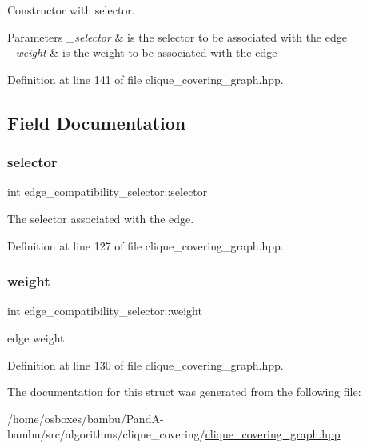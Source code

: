 Constructor with selector. 


\begin{DoxyParams}{Parameters}
{\em \+\_\+selector} & is the selector to be associated with the edge \\
\hline
{\em \+\_\+weight} & is the weight to be associated with the edge \\
\hline
\end{DoxyParams}


Definition at line 141 of file clique\+\_\+covering\+\_\+graph.\+hpp.



\subsection{Field Documentation}
\mbox{\label{structedge__compatibility__selector_aefa2ed746b66dbb338f27726b2681ec4}} 
\subsubsection{\texorpdfstring{selector}{selector}}
{\footnotesize\ttfamily int edge\+\_\+compatibility\+\_\+selector\+::selector}



The selector associated with the edge. 



Definition at line 127 of file clique\+\_\+covering\+\_\+graph.\+hpp.

\mbox{\label{structedge__compatibility__selector_a41b75fa94fa11ccdd3515e3adb138134}} 
\subsubsection{\texorpdfstring{weight}{weight}}
{\footnotesize\ttfamily int edge\+\_\+compatibility\+\_\+selector\+::weight}



edge weight 



Definition at line 130 of file clique\+\_\+covering\+\_\+graph.\+hpp.



The documentation for this struct was generated from the following file\+:\begin{DoxyCompactItemize}
\item 
/home/osboxes/bambu/\+Pand\+A-\/bambu/src/algorithms/clique\+\_\+covering/\hyperlink{clique__covering__graph_8hpp}{clique\+\_\+covering\+\_\+graph.\+hpp}\end{DoxyCompactItemize}
